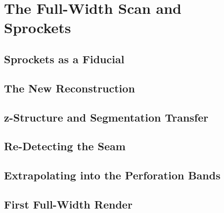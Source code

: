 \chapter{The Full-Width Scan and Sprockets}
\label{chap:fullwidth-scan}

\section{Sprockets as a Fiducial}
\label{sec:fw-motivation}

\section{The New Reconstruction}
\label{sec:fw-reconstruction}

\section{z-Structure and Segmentation Transfer}
\label{sec:fw-zstructure}

\section{Re-Detecting the Seam}
\label{sec:fw-seam}

\section{Extrapolating into the Perforation Bands}
\label{sec:fw-extrapolation}

\section{First Full-Width Render}
\label{sec:fw-render}

